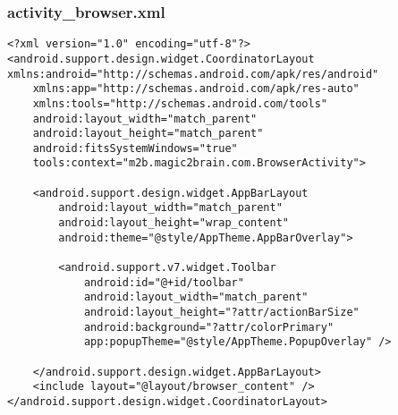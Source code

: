 \subsubsection*{activity\_browser.xml}
\begin{lstlisting}
<?xml version="1.0" encoding="utf-8"?>
<android.support.design.widget.CoordinatorLayout xmlns:android="http://schemas.android.com/apk/res/android"
    xmlns:app="http://schemas.android.com/apk/res-auto"
    xmlns:tools="http://schemas.android.com/tools"
    android:layout_width="match_parent"
    android:layout_height="match_parent"
    android:fitsSystemWindows="true"
    tools:context="m2b.magic2brain.com.BrowserActivity">

    <android.support.design.widget.AppBarLayout
        android:layout_width="match_parent"
        android:layout_height="wrap_content"
        android:theme="@style/AppTheme.AppBarOverlay">

        <android.support.v7.widget.Toolbar
            android:id="@+id/toolbar"
            android:layout_width="match_parent"
            android:layout_height="?attr/actionBarSize"
            android:background="?attr/colorPrimary"
            app:popupTheme="@style/AppTheme.PopupOverlay" />

    </android.support.design.widget.AppBarLayout>
    <include layout="@layout/browser_content" />
</android.support.design.widget.CoordinatorLayout>
\end{lstlisting}

